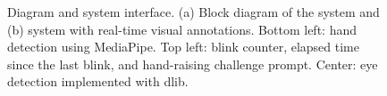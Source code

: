\documentclass[english,hidelinks]{sbrt}
\begin{document}


\begin{figure}
    \centering
    \hfill
        \caption{Diagram and system interface. (a) Block diagram of the system and (b) system with real-time visual annotations. Bottom left: hand detection using MediaPipe. Top left: blink counter, elapsed time since the last blink, and hand-raising challenge prompt. Center: eye detection implemented with dlib.}
\end{figure}

\end{document}
